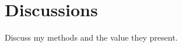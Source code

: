 \pagestyle{plain}
\chapter{Discussions} 
\renewcommand{\thetable}{\arabic{chapter}.\arabic{table}}  
\renewcommand{\thefigure}{\arabic{chapter}.\arabic{figure}} 

Discuss my methods and the value they present.